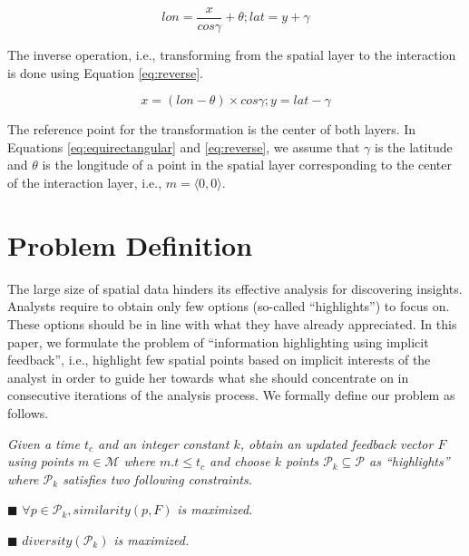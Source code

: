 \documentclass[sigconf,edbt]{acmart-edbt2019}
\begin{document}
\begin{equation}\label{eq:equirectangular}
\mathit{lon} = \frac{x}{\mathit{cos}\gamma} + \theta; \mathit{lat} = y + \gamma 
\end{equation}

The inverse operation, i.e., transforming from the spatial layer to the interaction is done using Equation \ref{eq:reverse}.

\begin{equation}\label{eq:reverse}
x = (\mathit{lon} - \theta) \times \mathit{cos}\gamma; y = \mathit{lat} - \gamma
\end{equation}

\vspace{2pt}
The reference point for the transformation is the center of both layers. In Equations \ref{eq:equirectangular} and \ref{eq:reverse}, we assume that $\gamma$ is the latitude and $\theta$ is the longitude of a point in the spatial layer corresponding to the center of the interaction layer, i.e., $m= \langle 0,0 \rangle$.

\section{Problem Definition}
\label{sec:problem}
The large size of spatial data hinders its effective analysis for discovering insights. Analysts require to obtain only few options (so-called ``highlights'') to focus on. These options should be in line with what they have already appreciated. In this paper, we formulate the problem of ``information highlighting using implicit feedback'', i.e., highlight few spatial points based on implicit interests of the analyst in order to guide her towards what she should concentrate on in consecutive iterations of the analysis process. We formally define our problem as follows.

\vspace{3pt}
 {\em Given a time $t_c$ and an integer constant $k$, obtain an updated feedback vector $F$ using points $m \in \mathcal{M}$ where $m.t \leq t_c$ and choose $k$ points $\mathcal{P}_k \subseteq \mathcal{P}$ as ``highlights'' where $\mathcal{P}_k$ satisfies two following constraints.}

\vspace{2pt}
\noindent $\blacksquare$ $\forall p \in \mathcal{P}_k, \mathit{similarity}(p,F)$ {\em is maximized.}

\vspace{2pt}
\noindent $\blacksquare$ $\mathit{diversity}(\mathcal{P}_k)$ {\em is maximized.}
\end{document}
